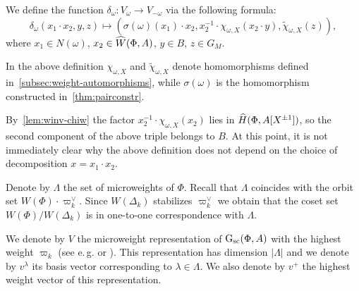 \begin{dfn} \label{sigma-def}
  We define the function $\delta_\omega \colon V_\omega \to V_{-\omega}$ via the following formula:
  \begin{equation} \label{eq:sigma-def} \delta_\omega(x_1 \cdot x_2, y, z) \mapsto (\sigma(\omega)(x_1)\cdot x_2, x_2^{-1} \cdot \chi_{\omega, X}(x_2 \cdot y), \widetilde{\chi}_{\omega, X}(z)), \end{equation}
  where $x_1 \in N(\omega)$, $x_2 \in \widehat{W}(\Phi, A)$,  $y \in B$, $z \in G_M$.
\end{dfn}

In the above definition $\chi_{\omega, X}$ and $\widetilde{\chi}_{\omega, X}$ denote homomorphisms defined in~\cref{subsec:weight-automorphisms},
 while $\sigma(\omega)$ is the homomorphism constructed in~\cref{thm:pairconstr}.

By~\cref{lem:winv-chiw} the factor $x_2^{-1} \cdot \chi_{\omega, X}(x_2)$ lies in $\widehat{H}(\Phi, A[X^{\pm 1}])$,
 so the second component of the above triple belongs to $B$.
At this point, it is not immediately clear why the above definition does not depend on the choice of decomposition $x = x_1 \cdot x_2$.

Denote by $\Lambda$ the set of microweights of $\Phi$.
Recall that $\Lambda$ coincides with the orbit set $W(\Phi) \cdot \varpi_k^\vee$.
Since $W(\Delta_k)$ stabilizes $\varpi_k^\vee$ we obtain that the coset set $W(\Phi)/W(\Delta_k)$ is in one-to-one correspondence with $\Lambda$.


We denote by $V$ the microweight representation of $\operatorname{G}_\mathrm{sc}(\Phi, A)$ with the highest weight $\varpi_k$ (see e.\,g. \cite[\S~2]{Ge17} or \cite[\S~1.1]{V00}).
This representation has dimension $|\Lambda| $ and we denote by $v^\lambda$ its basis vector corresponding to $\lambda \in \Lambda$.
We also denote by $v^+$ the highest weight vector of this representation.

